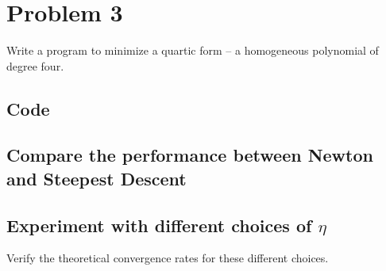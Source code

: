 \documentclass{article}
\begin{document}
\section{Problem 3}

Write a program to minimize a quartic form -- a homogeneous polynomial
of degree four. 

\subsection{Code}

\subsection{Compare the performance between Newton and Steepest Descent}

\subsection{Experiment with different choices of $\eta$}

Verify the theoretical convergence rates for these different choices. 
\end{document}
